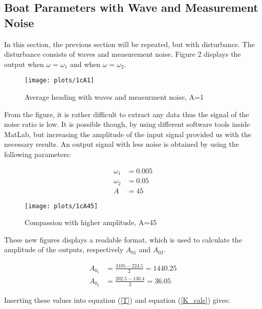 \subsection{Boat Parameters with Wave and Measurement Noise}

In this section, the previous section will be repeated, but with disturbance. The disturbance consists of waves and measurement noise. Figure 2 displays the output when $\omega = \omega_{1}$ and when $\omega = \omega_{2}$.

\begin{figure}[!htb]
    \caption{Average heading with waves and measurment noise, A=1}
    \centering
    \centerline{\texttt{[image: plots/1cA1]}}
\end{figure}




From the figure, it is rather difficult to extract any data thus the signal of the noise ratio is low. It is possible though, by using different software tools inside MatLab, but increasing the amplitude of the input signal provided us with the necessary results. An output signal with less noise is obtained by using the following parameters:

\begin{align*}
\omega_1 &= 0.005\\
\omega_2 &= 0.05\\
A &= 45
\end{align*}


\begin{figure}[!htb]
    \caption{Compassion with higher amplitude, A=45}
    \centering
    \centerline{\texttt{[image: plots/1cA45]}}
\end{figure}

These new figures displays a readable format, which is used to calculate the amplitude of the outputs, respectively $A_{01}$ and $A_{02}$.

\begin{align*}
{A_{{0_1}}}  &= \frac{{3105 - 224.5}}{2} = 1440.25\\
{A_{{0_2}}} &= \frac{{202.5 - 130.4}}{2} = 36.05
\end{align*}

Inserting these values into equation (\ref{T}) and equation (\ref{K_calc}) gives:


